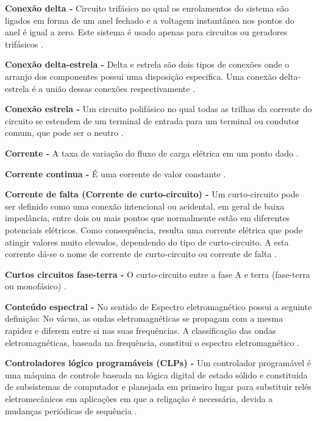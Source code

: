 \noindent
\textbf{Conexão delta -} Circuito trifásico no qual os enrolamentos do sistema são ligados em forma de um anel fechado e a voltagem instantânea nos pontos do anel é igual a zero. Este sistema é usado apenas para circuitos ou geradores trifásicos \cite{GAR82}.

\noindent
\textbf{Conexão delta-estrela -} Delta e estrela são dois tipos de conexões onde o arranjo dos componentes possui uma disposição especifica. Uma conexão delta-estrela é a união dessas conexões respectivamente \cite{SAD03}.

\noindent
\textbf{Conexão estrela -} Um circuito polifásico no qual todas as trilhas da corrente do circuito se estendem de um terminal de entrada para um terminal ou condutor comum, que pode ser o neutro \cite{GAR82}.

\noindent
\textbf{Corrente -} A taxa de variação do fluxo de carga elétrica em um ponto dado \cite{DOR08}.

\noindent
\textbf{Corrente continua -} É uma corrente de valor constante \cite{DOR08}.

\noindent
\textbf{Corrente de falta (Corrente de curto-circuito) -} Um curto-circuito pode ser definido como uma conexão intencional ou acidental, em geral de baixa impedância, entre dois ou mais pontos que normalmente estão em diferentes potenciais elétricos. Como consequência, resulta uma corrente elétrica que pode atingir valores muito elevados, dependendo do tipo de curto-circuito. A esta corrente dá-se o nome de corrente de curto-circuito ou corrente de falta \cite{SAN09}.

\noindent
\textbf{Curtos circuitos fase-terra -} O curto-circuito entre a fase A e terra (fase-terra ou monofásico) \cite{SAN09}.

\noindent
\textbf{Conteúdo espectral -} No sentido de Espectro eletromagnético possui a seguinte definição: No vácuo, as ondas eletromagnéticas se propagam com a mesma rapidez e diferem entre si nas suas frequências. A classificação das ondas eletromagnéticas, baseada na frequência, constitui o espectro eletromagnético \cite{HET02}.

\noindent
\textbf{Controladores lógico programáveis (CLPs) -} Um controlador programável é uma máquina de controle baseada na lógica digital de estado sólido e constituída de subsistemas de computador e planejada em primeiro lugar para substituir relés eletromecânicos em aplicações em que a religação é necessária, devida a mudanças periódicas de sequência \cite{GAR82}.

